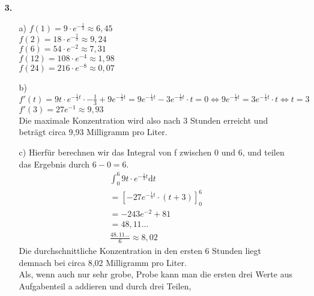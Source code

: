 \documentclass[a4paper,11pt]{article}
\begin{document}
\begin{enumerate}
\begin{enumerate}
 
        \end{enumerate}



        \item[\textbf{3.}]
         
            \begin{enumerate}
                \item[a)]
                    \(f(1)=9 \cdot e^{-\frac{1}{3}} \approx 6,45\)\\
                    \(f(2)=18 \cdot e^{-\frac{2}{3}} \approx 9,24\)\\
                    \(f(6)=54 \cdot e^{-2} \approx 7,31\)\\
                    \(f(12)=108 \cdot e^{-4} \approx 1,98\)\\
                    \(f(24)=216 \cdot e^{-8} \approx 0,07\)\\
                \item[b)]
                    \( f'(t)= 9t \cdot e^{-\frac{1}{3}t} \cdot -\frac{1}{3} + 9e^{-\frac{1}{3}t} = 9e^{-\frac{1}{3}t} - 3e^{-\frac{1}{3}t} \cdot t
                    = 0 \Leftrightarrow 9e^{-\frac{1}{3}t} = 3e^{-\frac{1}{3}t} \cdot t \Leftrightarrow t=3 \)\\
                    \( f'(3)=27e^{-1} \approx 9,93 \)\\
                    Die maximale Konzentration wird also nach 3 Stunden erreicht und beträgt circa 9,93 Milligramm pro Liter.
                \item[c)]
                    Hierfür berechnen wir das Integral von f zwischen 0 und 6, und teilen das Ergebnis durch $6-0=6$.\\
                    \begin{align*}
                        \int_0^6 9t \cdot e^{-\frac{1}{3}t} \mathrm{d}t\\
                        = [-27 e^{-\frac{1}{3}t} \cdot (t+3)]_0^6\\
                        = -243 e^{-2} + 81\\
                        = 48,11... \\
                        \frac{48,11...}{6} \approx 8,02
                    \end{align*}
                    Die durchschnittliche Konzentration in den ersten 6 Stunden liegt demnach bei circa 8,02 Milligramm pro Liter.\\
                    Als, wenn auch nur sehr grobe, Probe kann man die ersten drei Werte aus Aufgabenteil a addieren und durch drei Teilen,

\end{enumerate}
\end{enumerate}
\end{document}
